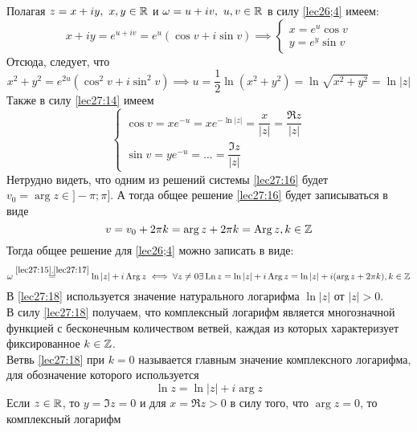 \documentclass[../../main.tex]{subfiles}
\begin{document}
Полагая $ z = x + iy,\ x, y \in \mathbb{R} $ и $ \omega = u + iv,\ u, v \in \mathbb{R} $
в силу \eqref{lec26;4} имеем:
\begin{equation}
\label{lec27:14}
x + iy = e^{u + iv} = e^u(\cos v + i\sin v) \implies
\begin{cases}
	x = e^u\cos v\\
	y = e^y\sin v
\end{cases}
\end{equation}
Отсюда, следует, что 
\begin{equation}
\label{lec27:15}
x^2 + y^2 = e^{2u}
(\cos^2 v + i\sin^2 v) \implies 
u = \dfrac{1}{2} \ln(x^2 + y^2) = 
\ln \sqrt{x^2 + y^2} = \ln|z|
\end{equation}
Также в силу \eqref{lec27:14} имеем
\begin{equation}
\label{lec27:16}
\begin{cases}
\cos v = xe^{-u} = xe^{-\ln|z|} = \dfrac{x}{|z|} = \dfrac{\Re z}{|z|}\\
\sin v = ye^{-u} = \dots = \dfrac{\Im z}{|z|}
\end{cases}
\end{equation}
Нетрудно видеть, что одним из решений системы \eqref{lec27:16} будет 
$ v_0 = \arg z \in ]-\pi; \pi] $. А тогда общее решение \eqref{lec27:16}
будет записываться в виде
\begin{equation}
\label{lec27:17}
v = v_0 + 2\pi k = \arg z + 2\pi k = \operatorname{Arg} z, k \in \mathbb{Z}
\end{equation}
Тогда общее решение для \eqref{lec26;4} можно записать в виде:
\begin{equation}
\label{lec27:18}
\omega 
\stackrel{\eqref{lec27:15}, \eqref{lec27:17}}{=}
\ln |z| + i \operatorname{Arg} z \iff
\forall z \neq 0 \exists \operatorname{Ln} z = \ln |z| + i \operatorname{Arg} z = 
\ln |z| + i(\arg z + 2\pi k), k \in \mathbb{Z}
\end{equation}
В \eqref{lec27:18} используется значение натурального логарифма
$ \ln|z| $ от $ |z| > 0 $.\\
В силу \eqref{lec27:18} получаем, что комплексный логарифм является 
многозначной функцией с бесконечным количеством ветвей, каждая из которых
характеризует фиксированное $ k\in\mathbb{Z} $.\\
Ветвь \eqref{lec27:18} при $ k = 0 $ называется главным значение комплексного
логарифма, для обозначение которого используется 
\begin{equation}
\label{lec27:19}
\ln z = \ln|z| + i\arg z
\end{equation}
Если $ z \in \mathbb{R} $, то $ y = \Im z = 0 $ и для 
$ x = \Re z > 0 $ в силу того, что $ \arg z = 0 $, то комплексный логарифм
\end{document}
